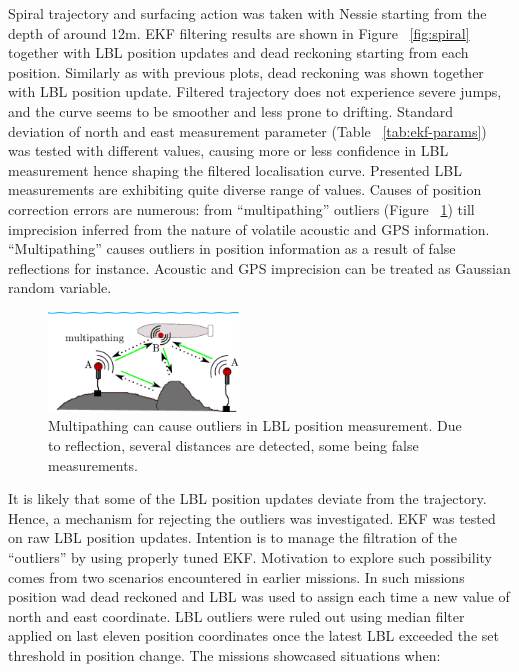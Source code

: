  Spiral trajectory and surfacing action was taken with Nessie starting from the depth of around 12m. EKF filtering results are shown in Figure ~\ref{fig:spiral} together with LBL position updates and dead reckoning starting from each position. Similarly as with previous plots, dead reckoning was shown together with LBL position update. Filtered trajectory does not experience severe jumps, and the curve seems to be smoother and less prone to drifting. Standard deviation of north and east measurement parameter (Table ~\ref{tab:ekf-params}) was tested with different values, causing more or less confidence in LBL measurement hence shaping the filtered localisation curve. Presented LBL measurements are exhibiting quite diverse range of values.
Causes of position correction errors are numerous: from ``multipathing'' outliers (Figure ~\ref{fig:multipathing}) till imprecision inferred from the nature of volatile acoustic and GPS information. ``Multipathing'' causes outliers in position information as a result of false reflections for instance. Acoustic and GPS imprecision can be treated as Gaussian random variable. 
\begin{figure}
\vspace{-10pt}
  \centering
    \includegraphics[width=0.45\textwidth]{results/fig/multipathing.eps}
  \caption{Multipathing can cause outliers in LBL position measurement. Due to reflection, several distances are detected, some  being false measurements.}
\label{fig:multipathing}
\end{figure}
It is likely that some of the LBL position updates deviate from the trajectory. Hence, a mechanism for rejecting the outliers was investigated. EKF was tested on raw LBL position updates. Intention is to manage the filtration of the ``outliers'' by using properly tuned EKF. Motivation to explore such possibility comes from two scenarios encountered in earlier missions. In such missions position wad dead reckoned and LBL was used to assign each time a new value of north and east coordinate. LBL outliers were ruled out using median filter applied on last eleven position coordinates once the latest LBL exceeded the set threshold in position change. The missions showcased situations when: 
